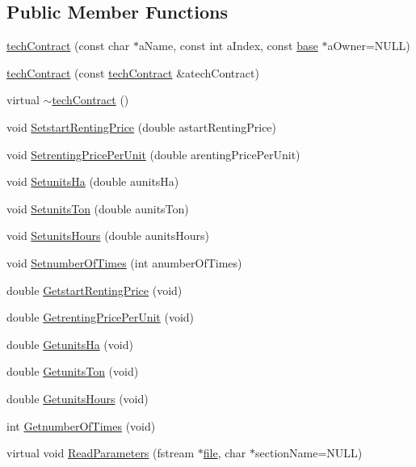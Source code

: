 \subsection*{Public Member Functions}
\begin{DoxyCompactItemize}
\item 
\hyperlink{classtech_contract_af151d2d9b742eb285dc482e6b5eacadc}{techContract} (const char $\ast$aName, const int aIndex, const \hyperlink{classbase}{base} $\ast$aOwner=NULL)
\item 
\hyperlink{classtech_contract_aa2076d20695bcdd353d3883c0e051510}{techContract} (const \hyperlink{classtech_contract}{techContract} \&atechContract)
\item 
virtual \hyperlink{classtech_contract_a1eb9a1c86d82f75d8c808871c3a790b0}{$\sim$techContract} ()
\item 
void \hyperlink{classtech_contract_a4cb6a5a5b0d20132628fc7346b594a21}{SetstartRentingPrice} (double astartRentingPrice)
\item 
void \hyperlink{classtech_contract_a6efd811b5d5aed99c106a576037a766b}{SetrentingPricePerUnit} (double arentingPricePerUnit)
\item 
void \hyperlink{classtech_contract_a997f741bff19d4c1552868a0211d7696}{SetunitsHa} (double aunitsHa)
\item 
void \hyperlink{classtech_contract_acfe7db8bf950bc960466b5b4cef5c7c7}{SetunitsTon} (double aunitsTon)
\item 
void \hyperlink{classtech_contract_a7f46e2f88908aff3ec2c43fe63d97308}{SetunitsHours} (double aunitsHours)
\item 
void \hyperlink{classtech_contract_a31af339397288e016ca5fef822dbcdd9}{SetnumberOfTimes} (int anumberOfTimes)
\item 
double \hyperlink{classtech_contract_a115403d337cbbbd223583b5dc689020b}{GetstartRentingPrice} (void)
\item 
double \hyperlink{classtech_contract_a8db21b54fa4302fb87673cdfaadd5a06}{GetrentingPricePerUnit} (void)
\item 
double \hyperlink{classtech_contract_aff7221c0f1f8bcdcd55f4ca03aae1c08}{GetunitsHa} (void)
\item 
double \hyperlink{classtech_contract_a68c58331d271c2495b4c69fa74148b06}{GetunitsTon} (void)
\item 
double \hyperlink{classtech_contract_a1f31c1df80da35dcbe325f27aa6f8f1f}{GetunitsHours} (void)
\item 
int \hyperlink{classtech_contract_a4ba04d5b945a4e9275b0eaa9fbaf75bd}{GetnumberOfTimes} (void)
\item 
virtual void \hyperlink{classtech_contract_ae2669826bdb3931c603d00e288011fff}{ReadParameters} (fstream $\ast$\hyperlink{classbase_a3af52ee9891719d09b8b19b42450b6f6}{file}, char $\ast$sectionName=NULL)
\end{DoxyCompactItemize}

